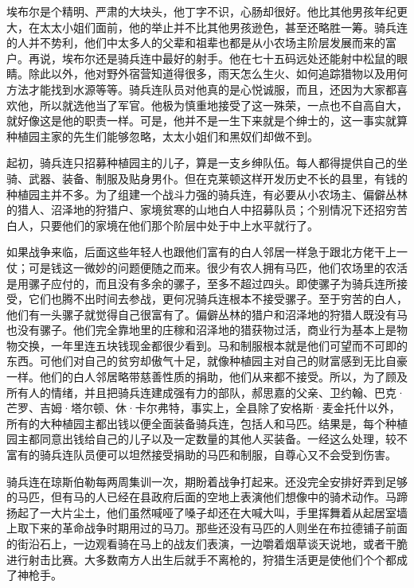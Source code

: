 \par 埃布尔是个精明、严肃的大块头，他丁字不识，心肠却很好。他比其他男孩年纪更大，在太太小姐们面前，他的举止并不比其他男孩逊色，甚至还略胜一筹。骑兵连的人并不势利，他们中太多人的父辈和祖辈也都是从小农场主阶层发展而来的富户。再说，埃布尔还是骑兵连中最好的射手。他在七十五码远处还能射中松鼠的眼睛。除此以外，他对野外宿营知道得很多，雨天怎么生火、如何追踪猎物以及用何方法才能找到水源等等。骑兵连队员对他真的是心悦诚服，而且，还因为大家都喜欢他，所以就选他当了军官。他极为慎重地接受了这一殊荣，一点也不自高自大，就好像这是他的职责一样。可是，他并不是一生下来就是个绅士的，这一事实就算种植园主家的先生们能够忽略，太太小姐们和黑奴们却做不到。
\par 起初，骑兵连只招募种植园主的儿子，算是一支乡绅队伍。每人都得提供自己的坐骑、武器、装备、制服及贴身男仆。但在克莱顿这样开发历史不长的县里，有钱的种植园主并不多。为了组建一个战斗力强的骑兵连，有必要从小农场主、偏僻丛林的猎人、沼泽地的狩猎户、家境贫寒的山地白人中招募队员；个别情况下还招穷苦白人，只要他们的家境在他们那个阶层中处于中上水平就行了。
\par 如果战争来临，后面这些年轻人也跟他们富有的白人邻居一样急于跟北方佬干上一仗；可是钱这一微妙的问题便随之而来。很少有农人拥有马匹，他们农场里的农活是用骡子应付的，而且没有多余的骡子，至多不超过四头。即使骡子为骑兵连所接受，它们也腾不出时间去参战，更何况骑兵连根本不接受骡子。至于穷苦的白人，他们有一头骡子就觉得自己很富有了。偏僻丛林的猎户和沼泽地的狩猎人既没有马也没有骡子。他们完全靠地里的庄稼和沼泽地的猎获物过活，商业行为基本上是物物交换，一年里连五块钱现金都很少看到。马和制服根本就是他们可望而不可即的东西。可他们对自己的贫穷却傲气十足，就像种植园主对自己的财富感到无比自豪一样。他们的白人邻居略带慈善性质的捐助，他们从来都不接受。所以，为了顾及所有人的情绪，并且把骑兵连建成强有力的部队，郝思嘉的父亲、卫约翰、巴克·芒罗、吉姆·塔尔顿、休·卡尔弗特，事实上，全县除了安格斯·麦金托什以外，所有的大种植园主都出钱以便全面装备骑兵连，包括人和马匹。结果是，每个种植园主都同意出钱给自己的儿子以及一定数量的其他人买装备。一经这么处理，较不富有的骑兵连队员便可以坦然接受捐助的马匹和制服，自尊心又不会受到伤害。
\par 骑兵连在琼斯伯勒每两周集训一次，期盼着战争打起来。还没完全安排好弄到足够的马匹，但有马的人已经在县政府后面的空地上表演他们想像中的骑术动作。马蹄扬起了一大片尘土，他们虽然喊哑了嗓子却还在大喊大叫，手里挥舞着从起居室墙上取下来的革命战争时期用过的马刀。那些还没有马匹的人则坐在布拉德铺子前面的街沿石上，一边观看骑在马上的战友们表演，一边嚼着烟草谈天说地，或者干脆进行射击比赛。大多数南方人出生后就手不离枪的，狩猎生活更是使他们个个都成了神枪手。
